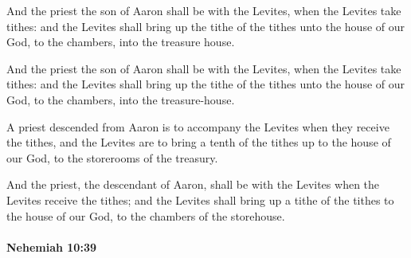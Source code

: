 			And the priest the son of Aaron shall be with the Levites, when the Levites take tithes: and the Levites shall bring up the tithe of the tithes unto the house of our God, to the chambers, into the treasure house.

			\begin{versebox}
					\item[BHS] 
					\item[LXX] 
					\item[ASV] And the priest the son of Aaron shall be with the Levites, when the Levites take tithes: and the Levites shall bring up the tithe of the tithes unto the house of our God, to the chambers, into the treasure-house.
					\item[NIV] A priest descended from Aaron is to accompany the Levites when they receive the tithes, and the Levites are to bring a tenth of the tithes up to the house of our God, to the storerooms of the treasury.
					\item[NRSV] And the priest, the descendant of Aaron, shall be with the Levites when the Levites receive the tithes; and the Levites shall bring up a tithe of the tithes to the house of our God, to the chambers of the storehouse.
			\end{versebox}

		\paragraph{Nehemiah 10:39} %
			\label{NEHEMIAH-10-39}

